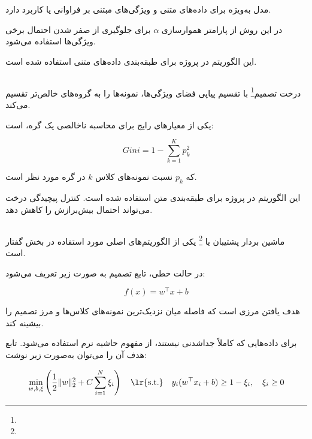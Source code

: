\documentclass[12pt,a4paper,oneside]{report}
\begin{document}
مدل
به‌ویژه برای داده‌های متنی و ویژگی‌های مبتنی بر فراوانی یا
کاربرد دارد.

در این روش از پارامتر هموارسازی
$\alpha$
برای جلوگیری از صفر شدن احتمال برخی ویژگی‌ها استفاده می‌شود.

این الگوریتم در پروژه برای طبقه‌بندی داده‌های متنی استفاده شده است.


\subsection{}

درخت تصمیم\footnote{} با تقسیم پیاپی فضای ویژگی‌ها، نمونه‌ها را به گروه‌های خالص‌تر تقسیم می‌کند.

یکی از معیارهای رایج برای محاسبه ناخالصی یک گره،
است:

\begin{equation}
Gini
=
1-
\sum_{k=1}^{K}
p_k^2
\end{equation}

که $p_k$ نسبت نمونه‌های کلاس $k$ در گره مورد نظر است.

این الگوریتم در پروژه برای طبقه‌بندی متن استفاده شده است. کنترل پیچیدگی درخت می‌تواند احتمال بیش‌برازش را کاهش دهد.


\subsection{}

ماشین بردار پشتیبان یا
\footnote{}
یکی از الگوریتم‌های اصلی مورد استفاده در بخش گفتار است.

در حالت خطی، تابع تصمیم به صورت زیر تعریف می‌شود:

\begin{equation}
f(x)
=
w^\top x+b
\end{equation}

هدف
یافتن مرزی است که فاصله میان نزدیک‌ترین نمونه‌های کلاس‌ها و مرز تصمیم را بیشینه کند.

برای داده‌هایی که کاملاً جداشدنی نیستند، از مفهوم حاشیه نرم استفاده می‌شود. تابع هدف آن را می‌توان به‌صورت زیر نوشت:

\begin{equation}
\min_{w,b,\xi}
\left(
\frac{1}{2}\|w\|_2^2
+
C\sum_{i=1}^{N}\xi_i
\right)
\quad
\text{\lr{s.t.}}
\quad
y_i(w^\top x_i+b)\geq 1-\xi_i,
\quad
\xi_i\geq 0
\end{equation}
\end{document}
